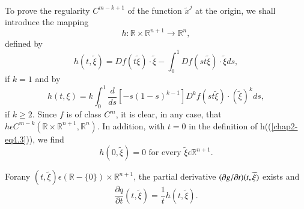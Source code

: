To prove the regularity $C^{m-k+1}$ of the function
$\widetilde{x}^{j}$ at the origin, we shall introduce the mapping
$$
h : \mathbb{R} \times \mathbb{R}^{n+1} \to \mathbb{R}^{n},
$$
defined by
\begin{equation*}
h(t, \widetilde{\xi}) = Df(t\widetilde{\xi}) \cdot \widetilde{\xi} -
\int_{0}^{1} Df(st \widetilde{\xi}) \cdot \widetilde{\xi} ds,\tag{4.2}\label{chap2-eq4.2}
\end{equation*}
if $k = 1$ and by
\begin{equation*}
h(t, \xi) = k \int_{0}^{1} \frac{d}{ds} [-s(1-s)^{k-1}]
D^{k}f(st\widetilde{\xi}) \cdot (\widetilde{\xi})^{k} ds,\tag{4.3}\label{chap2-eq4.3}
\end{equation*}
if $k \geq 2$. Since $f$ is of class $C^{m}$, it is clear, in any case,
that $h \epsilon C^{m-k}(\mathbb{R} \times \mathbb{R}^{n+1},
\mathbb{R}^{n})$. In addition, with $t = 0$ in the definition of
h((\ref{chap2-eq4.3})), we find
\begin{equation*}
h(0, \widetilde{\xi}) = 0 \text{ for every } \widetilde{\xi} \epsilon
\mathbb{R}^{n+1}.\tag{4.4}\label{chap2-eq4.4}
\end{equation*}

\begin{lemma}\label{chap2-lem4.2}
For\pageoriginale any $(t, \widetilde{\xi}) \epsilon (\mathbb{R} -
\{0\}) \times \mathbb{R}^{n+1}$, the partial derivative $(\partial
  g/\partial t)\break (t, \widetilde{\xi})$ exists and
\begin{equation*}
\frac{\partial q}{\partial t} (t, \widetilde{\xi}) = \frac{1}{t}h(t, \widetilde{\xi}).\tag{4.5}\label{chap2-eq4.5}
\end{equation*}
\end{lemma}

